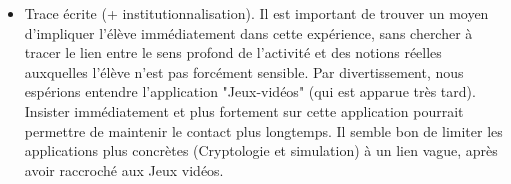 \documentclass{article}
\begin{document}
\begin{itemize}
\item Trace écrite (+ institutionnalisation). Il est important de trouver un moyen d'impliquer l'élève immédiatement dans cette expérience, sans chercher à tracer le lien entre le sens profond de l'activité et des notions réelles auxquelles l'élève n'est pas forcément sensible. Par divertissement, nous espérions entendre l'application "Jeux-vidéos" (qui est apparue très tard). Insister immédiatement et plus fortement sur cette application pourrait permettre de maintenir le contact plus longtemps. Il semble bon de limiter les applications plus concrètes (Cryptologie et simulation) à un lien vague, après avoir raccroché aux Jeux vidéos.
\end{itemize}
\end{document}

